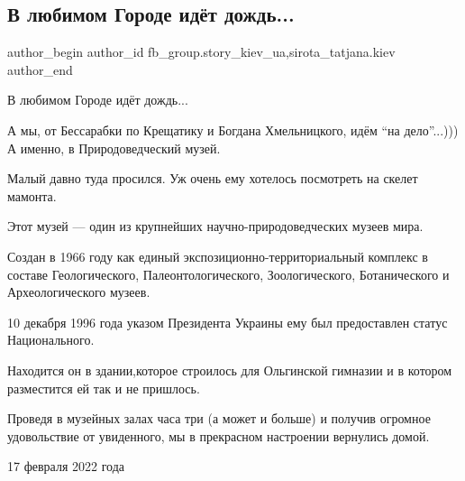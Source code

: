  
 
 
 
 
 
\subsection{В любимом Городе идёт дождь...}
\label{sec:18_02_2022.fb.fb_group.story_kiev_ua.1.gorod_dozhd}
 
\ifcmt
 author_begin
   author_id fb_group.story_kiev_ua,sirota_tatjana.kiev
 author_end
\fi

В любимом Городе идёт дождь...

А мы, от Бессарабки по Крещатику и Богдана Хмельницкого, идём \enquote{на
дело}...))) А именно, в Природоведческий музей.


Малый давно туда просился. Уж очень ему хотелось посмотреть на скелет мамонта.

Этот музей — один из крупнейших научно-природоведческих музеев мира.

\raggedcolumns
\begin{multicols}{2} %
\setlength{\parindent}{0pt}


\end{multicols} %

Создан в 1966 году  как единый экспозиционно-территориальный комплекс в составе
Геологического, Палеонтологического, Зоологического, Ботанического и
Археологического музеев.

10 декабря 1996 года указом Президента Украины ему  был предоставлен статус
Национального.

Находится он в здании,которое строилось для Ольгинской гимназии и в котором
разместится  ей так и не пришлось.   

Проведя в музейных залах часа три (а может и больше) и получив огромное
удовольствие от увиденного, мы в прекрасном настроении вернулись домой.

17 февраля 2022 года
